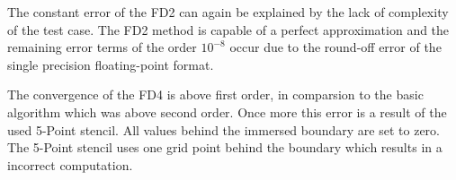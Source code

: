 The constant error of the FD2 can again be explained by the lack of complexity of the test case.
The FD2 method is capable of a perfect approximation and
the remaining error terms of the order $10^{-8}$
occur due to the round-off error of the single precision floating-point format.

The convergence of the FD4 is above first order, in comparsion to the basic algorithm which was above second order.
Once more this error is a result of the used 5-Point stencil.  All values behind the immersed boundary are set
to zero. The 5-Point stencil uses one grid point behind the boundary which results in a incorrect computation.

